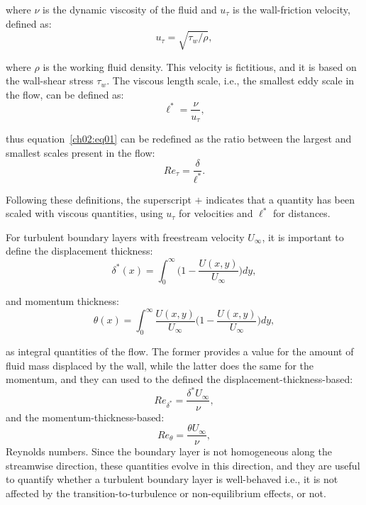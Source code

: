 \noindent where $\nu$ is the dynamic viscosity of the fluid and $u_{\tau}$ is the wall-friction velocity, defined as:
\begin{equation}
  u_{\tau}=\sqrt{\tau_w/\rho},
\end{equation}

\noindent where $\rho$ is the working fluid density.
This velocity is fictitious, and it is based on the wall-shear stress $\tau_w$.
The viscous length scale, i.e., the smallest eddy scale in the flow, can be defined as:
\begin{equation}
  \ell^*=\frac{\nu}{u_{\tau}},
  \label{ch02:eq02}
\end{equation}

\noindent thus equation~\ref{ch02:eq01} can be redefined as the ratio between the largest and smallest scales present in the flow:
\begin{equation}
  Re_{\tau}=\frac{\delta}{\ell^*}.
  \label{ch02:eq03}
\end{equation}

\noindent Following these definitions, the superscript $+$ indicates that a quantity has been scaled with viscous quantities, using $u_{\tau}$ for velocities and $\ell^*$ for distances.

For turbulent boundary layers with freestream velocity $U_{\infty}$, it is important to define the displacement thickness:
\begin{equation}
  \delta^*(x)=\int_0^{\infty}\biggl(1-\frac{U(x,y)}{U_{\infty}}\biggl)dy,
  \label{ch02:eq03}
\end{equation}

\noindent and momentum thickness:
\begin{equation}
  \theta(x)=\int_0^{\infty}\frac{U(x,y)}{U_{\infty}}\biggl(1-\frac{U(x,y)}{U_{\infty}}\biggl)dy,
  \label{ch02:eq04}
\end{equation}

\noindent as integral quantities of the flow.
The former provides a value for the amount of fluid mass displaced by the wall, while the latter does the same for the momentum, and they can used to the defined the displacement-thickness-based:
\begin{equation}
  Re_{\delta^*}=\frac{\delta^*U_{\infty}}{\nu},
  \label{ch02:eq05}
\end{equation}
\noindent and the momentum-thickness-based:
\begin{equation}
  Re_{\theta}=\frac{\theta U_{\infty}}{\nu},
  \label{ch02:eq06}
\end{equation}
\noindent Reynolds numbers.
Since the boundary layer is not homogeneous along the streamwise direction, these quantities evolve in this direction, and they are useful to quantify whether a turbulent boundary layer is well-behaved i.e., it is not affected by the transition-to-turbulence or non-equilibrium effects, or not.

